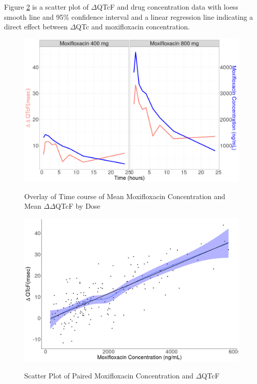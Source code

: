\documentclass[
]{article}
\begin{document}
Figure \ref{fig:delta_loess} is a scatter plot of \(\Delta\)QTcF and
drug concentration data with loess smooth line and 95\% confidence
interval and a linear regression line indicating a direct effect between
\(\Delta\)QTc and moxifloxacin concentration.

\begin{figure}[H]
\caption{Overlay of Time course of Mean Moxifloxacin Concentration and Mean $\Delta \Delta$QTcF by Dose} 
\includegraphics[width=\textwidth]{../Report/Figures/DDQTC_pk.png}
\label{fig:DDQTC_pk}
\end{figure}

\begin{figure}[H]
\caption{Scatter Plot of Paired  Moxifloxacin Concentration and $\Delta$QTcF} 
\includegraphics[width=\textwidth]{../Report/Figures/delta_loess.png}
\label{fig:delta_loess}
\end{figure}
\end{document}
